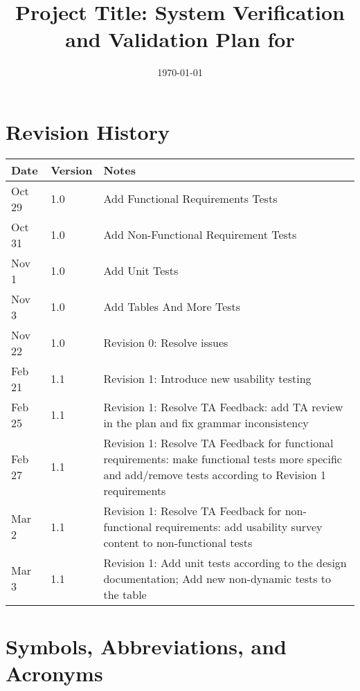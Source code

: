 \documentclass[12pt, titlepage]{article}
\begin{document}
\title{Project Title: System Verification and Validation Plan for \progname{}} 
\author{\authname}
\date{\today}
	
\maketitle


\section*{Revision History}

\begin{tabularx}{\textwidth}{p{3cm}p{2cm}X}
\toprule {\bf Date} & {\bf Version} & {\bf Notes}\\
\midrule
Oct 29 & 1.0 & Add Functional Requirements Tests\\
Oct 31 & 1.0 & Add Non-Functional Requirement Tests\\
Nov 1 & 1.0 & Add Unit Tests\\
Nov 3 & 1.0 & Add Tables And More Tests\\
Nov 22 & 1.0 & Revision 0: Resolve issues\\
Feb 21 & 1.1 & Revision 1: Introduce new usability testing\\
Feb 25 & 1.1 & Revision 1: Resolve TA Feedback: add TA review in the plan and fix grammar inconsistency\\
Feb 27 & 1.1 & Revision 1: Resolve TA Feedback for functional requirements: make functional tests more specific and add/remove tests according to Revision 1 requirements\\
Mar 2 & 1.1 & Revision 1: Resolve TA Feedback for non-functional requirements: add usability survey content to non-functional tests\\
Mar 3 & 1.1 & Revision 1: Add unit tests according to the design documentation; Add new non-dynamic tests to the table\\
\bottomrule
\end{tabularx}

\newpage

\tableofcontents

\listoftables

\newpage

\section{Symbols, Abbreviations, and Acronyms}
\end{document}

